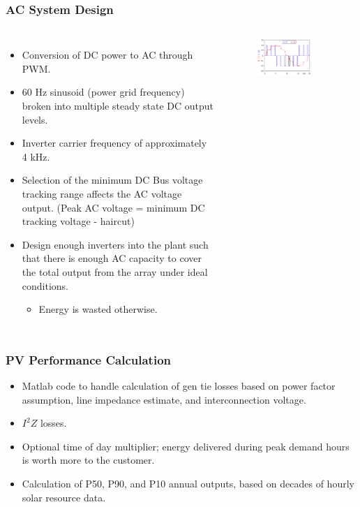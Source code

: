 \documentclass[aspectratio=169]{beamer}
\begin{document}
\begin{frame}
  \frametitle{AC System Design}
  \begin{columns}[t]
    \begin{itemize}
    \item Conversion of DC power to AC through PWM.
    \item 60 Hz sinusoid (power grid frequency) broken into multiple
      steady state DC output levels.
    \item Inverter carrier frequency of approximately 4 kHz.
    \item Selection of the minimum DC Bus voltage tracking range
      affects the AC voltage output. (Peak AC voltage = minimum DC
      tracking voltage - haircut)
    \item Design enough inverters into the plant such that there is
      enough AC capacity to cover the total output from the array
      under ideal conditions.
      \begin{itemize}
      \item Energy is wasted otherwise.
      \end{itemize}
    \end{itemize}

    \begin{figure}
      \includegraphics[width=0.75\textwidth]{PWM.png}
    \end{figure}    
  \end{columns}
\end{frame}

\begin{frame}
  \frametitle{PV Performance Calculation}
  \begin{itemize}
  \item Matlab code to handle calculation of gen tie losses based on
    power factor assumption, line impedance estimate, and
    interconnection voltage.
  \item $I^{2}Z$ losses.
  \item Optional time of day multiplier; energy delivered during peak
    demand hours is worth more to the customer.
  \item Calculation of P50, P90, and P10 annual outputs, based on
    decades of hourly solar resource data.
  \end{itemize}
\end{frame}
\end{document}
